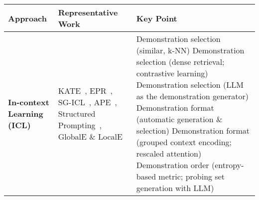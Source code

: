 \begin{table}[h!]
	\centering
	\tiny
	\begin{tabularx}{\textwidth}{|l|X|X|}
		\hline
		\textbf{Approach}                         & \textbf{Representative Work}                                                                                                                                                                                                                                                                                                                                                                                                                 & \textbf{Key Point}                                                                                                                                                                                                                                                                                                                                                                                                                                                                                                                                                                                                                                                                                                                                                                                                                                                          \\
		\hline
		\textbf{In-context Learning (ICL)}        & KATE~\cite{liu2022good}, EPR~\cite{rubin2022learning}, SG-ICL~\cite{kim2022self}, APE~\cite{zhou2023large}, Structured Prompting~\cite{hao2022structured}, GlobalE \& LocalE~\cite{lu2022fantastically}                                                                                                                                                                                                                                      & Demonstration selection (similar, k-NN) \newline Demonstration selection (dense retrieval; contrastive learning) \newline Demonstration selection (LLM as the demonstration generator) \newline Demonstration format (automatic generation \& selection) \newline Demonstration format (grouped context encoding; rescaled attention) \newline Demonstration order (entropy-based metric; probing set generation with LLM)                                                                                                                                                                                                                                                                                                                                                                                                                                                  \\

\end{tabularx}
\end{table}
